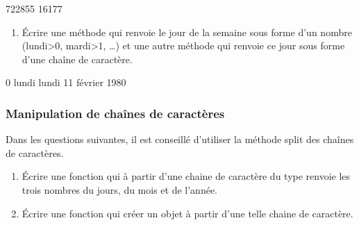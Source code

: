 \documentclass[letterpaper,10pt,english]{sphinxhowto}
\begin{document}
\begin{sphinxVerbatim}[commandchars=\\\{\}]
722855
16177
\end{sphinxVerbatim}
\begin{enumerate}
%
\setcounter{enumi}{9}
\item {} 
\sphinxAtStartPar
Écrire une méthode qui renvoie le jour de la semaine sous forme d’un nombre (lundi\sphinxhyphen{}>0, mardi\sphinxhyphen{}>1, …) et une autre méthode qui renvoie ce jour sous forme d’une chaîne de caractère.

\end{enumerate}

\begin{sphinxVerbatim}[commandchars=\\\{\}]
    


\end{sphinxVerbatim}

\begin{sphinxVerbatim}[commandchars=\\\{\}]
0
lundi
lundi 11 février 1980
\end{sphinxVerbatim}


\subsubsection{Manipulation de chaînes de caractères}
\label{\detokenize{devoir_maison_Devoir Maison:manipulation-de-chaines-de-caracteres}}
\sphinxAtStartPar
Dans les questions suivantes, il est conseillé d’utiliser la méthode split des chaînes de caractères.
\begin{enumerate}
%
\setcounter{enumi}{10}
\item {} 
\sphinxAtStartPar
Écrire une fonction qui à partir d’une chaine de caractère du type  renvoie les trois nombres du jours, du mois et de l’année.

\item {} 
\sphinxAtStartPar
Écrire une fonction qui créer un objet  à partir d’une telle chaine de caractère.

\end{enumerate}
\end{document}
